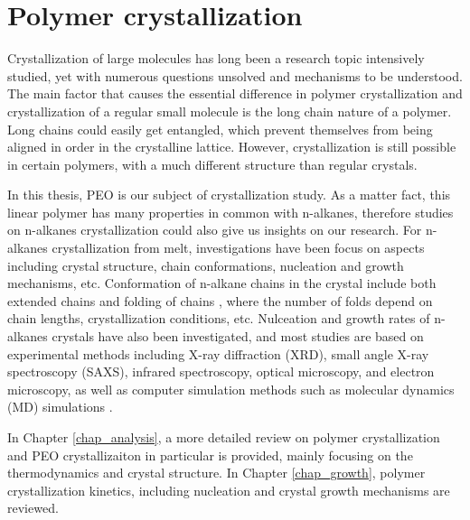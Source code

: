 \section{Polymer crystallization}

Crystallization of large molecules has long been a research topic intensively studied, yet with numerous questions unsolved and mechanisms to be understood. The main factor that causes the essential difference in polymer crystallization and crystallization of a regular small molecule is the long chain nature of a polymer. Long chains could easily get entangled, which prevent themselves from being aligned in order in the crystalline lattice. However, crystallization is still possible in certain polymers, with a much different structure than regular crystals.

In this thesis, PEO is our subject of crystallization study. As a matter fact, this linear polymer has many properties in common with n-alkanes, therefore studies on n-alkanes crystallization could also give us insights on our research. For n-alkanes crystallization from melt, investigations have been focus on aspects including crystal structure, chain conformations, nucleation and growth mechanisms, etc. Conformation of n-alkane chains in the crystal include both extended chains and folding of chains \cite{Organ1996,Alamo1993}, where the number of folds depend on chain lengths, crystallization conditions, etc. Nulceation and growth rates of n-alkanes crystals have also been investigated, and most studies are based on experimental methods including X-ray diffraction (XRD), small angle X-ray spectroscopy (SAXS), infrared spectroscopy, optical microscopy, and electron microscopy, as well as computer simulation methods such as molecular dynamics (MD) simulations \cite{Anwar2013,Yamamoto2016}.

In Chapter \ref{chap_analysis}, a more detailed review on polymer crystallization and PEO crystallizaiton in particular is provided, mainly focusing on the thermodynamics and crystal structure. In Chapter \ref{chap_growth}, polymer crystallization kinetics, including nucleation and crystal growth mechanisms are reviewed.
